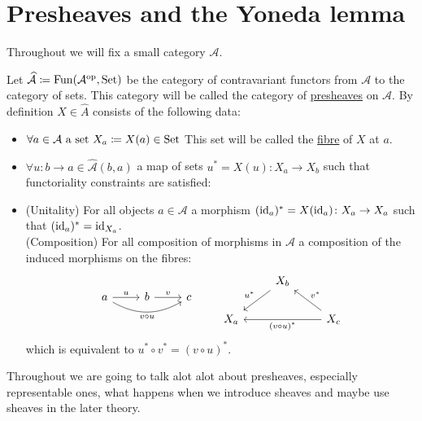 \section{Presheaves and the Yoneda lemma}

Throughout we will fix a small category $\mathcal{A}$.

\begin{defi}
    Let $\widehat{\mathcal{A}}\coloneqq \operatorname{Fun}(\mathcal{A}^{\operatorname{op}},\operatorname{Set})$ be the category of contravariant functors from $\mathcal{A}$ to the category of sets.
    This category will be called the category of \underline{presheaves} on $\mathcal{A}$.
    By definition $X \in \widehat{A}$ consists of the following data:
    \begin{itemize}
        \item 
        $\forall a \in \mathcal{A} \text{ a set } X_a \coloneqq X(a) \in \operatorname{Set}$
        This set will be called the \underline{fibre} of $X$ at $a$.
        \item 
        $\forall u\colon b \to a\in \widehat{\mathcal{A}}(b,a)$ a map of sets $u^*=X(u)\colon X_a \to X_b$ such that functoriality constraints are satisfied:
        \item 
        (Unitality) For all objects $a \in \mathcal{A}$ a morphism $(\operatorname{id}_a)^*=X(\operatorname{id}_a)\colon X_a \to X_a$ such that $(\operatorname{id}_a)^*=\operatorname{id}_{X_a}$.
        \\
        (Composition) For all composition of morphisms in $\mathcal{A}$ a composition of the induced morphisms on the fibres:
        \[
            \begin{tikzcd}
                a
                \arrow{r}[above]{u}
                \arrow[rr, bend right, "v \circ u"']
                &
                b
                \arrow{r}[above]{v}
                &
                c
            \end{tikzcd} 
            \qquad
            \begin{tikzcd}
                &
                X_b
                \arrow[dl, "u^*"']
                &
                \\
                X_a 
                &
                &
                X_c
                \arrow[ul,"v^*"']    
                \arrow[ll,"(v \circ u)^*"]
            \end{tikzcd}
        \]
        which is equivalent to $u^* \circ v^* = (v \circ u)^*$.
    \end{itemize}
\end{defi}

\begin{rmk}
    Throughout we are going to talk alot alot about presheaves, especially representable ones, what happens when we introduce sheaves and maybe use sheaves in the later theory.
\end{rmk}

